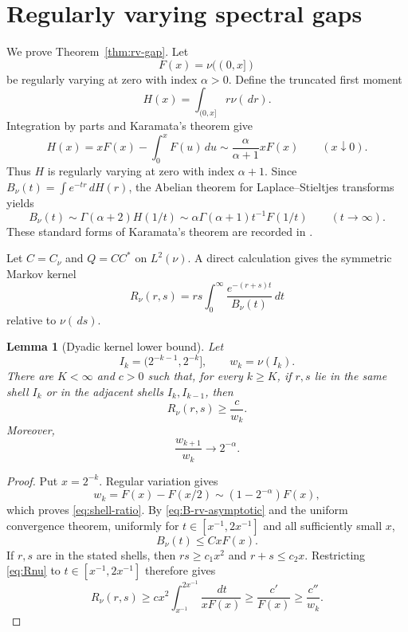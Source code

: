 \documentclass[11pt]{article}
\newtheorem{lemma}[theorem]{Lemma}
\theoremstyle{definition}
\theoremstyle{remark}
\newcommand{\dd}{\,d}
\begin{document}
\section{Regularly varying spectral gaps}
\label{sec:rv-gap}

We prove Theorem~\ref{thm:rv-gap}.  Let
\[
  F(x)=\nu((0,x])
\]
be regularly varying at zero with index $\alpha>0$.  Define the truncated first
moment
\begin{equation}
  H(x)=\int_{(0,x]}r\nu(\dd r).
  \label{eq:H-first-moment}
\end{equation}
Integration by parts and Karamata's theorem give
\begin{equation}
  H(x)=xF(x)-\int_0^xF(u)\dd u
  \sim\frac{\alpha}{\alpha+1}xF(x)
  \qquad(x\downarrow0).
  \label{eq:H-asymptotic}
\end{equation}
Thus $H$ is regularly varying at zero with index $\alpha+1$.  Since
$B_\nu(t)=\int e^{-tr}\dd H(r)$, the Abelian theorem for Laplace--Stieltjes
transforms yields
\begin{equation}
  B_\nu(t)
  \sim \Gamma(\alpha+2)H(1/t)
  \sim \alpha\Gamma(\alpha+1)t^{-1}F(1/t)
  \qquad(t\to\infty).
  \label{eq:B-rv-asymptotic}
\end{equation}
These standard forms of Karamata's theorem are recorded in
\cite[Chapters~1 and~4]{BGT1987}.

Let $C=C_\nu$ and $Q=CC^*$ on $L^2(\nu)$.  A direct calculation gives the
symmetric Markov kernel
\begin{equation}
  R_\nu(r,s)=rs\int_0^\infty
  \frac{e^{-(r+s)t}}{B_\nu(t)}\dd t
  \label{eq:Rnu}
\end{equation}
relative to $\nu(\dd s)$.

\begin{lemma}[Dyadic kernel lower bound]
\label{lem:rv-kernel-lower}
Let
\[
 I_k=(2^{-k-1},2^{-k}],
 \qquad w_k=\nu(I_k).
\]
There are $K<\infty$ and $c>0$ such that, for every $k\ge K$, if $r,s$ lie in
the same shell $I_k$ or in the adjacent shells $I_k,I_{k-1}$, then
\begin{equation}
  R_\nu(r,s)\ge\frac{c}{w_k}.
  \label{eq:rv-shell-lower}
\end{equation}
Moreover,
\begin{equation}
  \frac{w_{k+1}}{w_k}\longrightarrow2^{-\alpha}.
  \label{eq:shell-ratio}
\end{equation}
\end{lemma}

\begin{proof}
Put $x=2^{-k}$.  Regular variation gives
\[
  w_k=F(x)-F(x/2)\sim(1-2^{-\alpha})F(x),
\]
which proves \eqref{eq:shell-ratio}.  By
\eqref{eq:B-rv-asymptotic} and the uniform convergence theorem, uniformly for
$t\in[x^{-1},2x^{-1}]$ and all sufficiently small $x$,
\begin{equation}
  B_\nu(t)\le CxF(x).
  \label{eq:B-shell-upper}
\end{equation}
If $r,s$ are in the stated shells, then $rs\ge c_1x^2$ and
$r+s\le c_2x$.  Restricting \eqref{eq:Rnu} to
$t\in[x^{-1},2x^{-1}]$ therefore gives
\[
 R_\nu(r,s)
 \ge c x^2\int_{x^{-1}}^{2x^{-1}}
       \frac{\dd t}{xF(x)}
 \ge\frac{c'}{F(x)}
 \ge\frac{c''}{w_k}.
\]
\end{proof}
\end{document}
